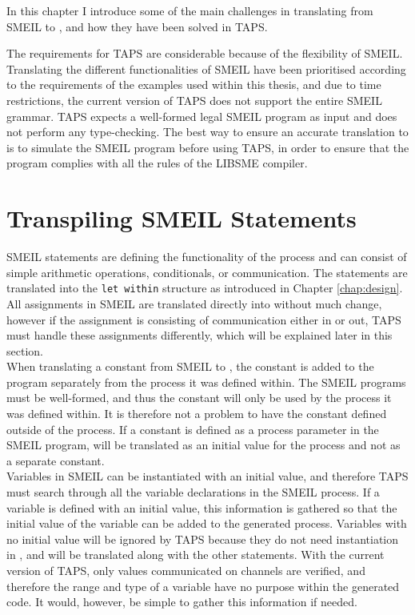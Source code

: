 In this chapter I introduce some of the main challenges in translating from SMEIL to \cspm{}, and how they have been solved in TAPS.

The requirements for TAPS are considerable because of the flexibility of SMEIL. Translating the different functionalities of SMEIL have been prioritised according to the requirements of the examples used within this thesis, and due to time restrictions, the current version of TAPS does not support the entire SMEIL grammar. TAPS expects a well-formed legal SMEIL program as input and does not perform any type-checking. The best way to ensure an accurate translation to \cspm{} is to simulate the SMEIL program before using TAPS, in order to ensure that the program complies with all the rules of the LIBSME compiler.
\section{Transpiling SMEIL Statements}
SMEIL statements are defining the functionality of the process and can consist of simple arithmetic operations, conditionals, or communication.
The statements are translated into the \texttt{let within} structure as introduced in Chapter \ref{chap:design}.\\

All assignments in SMEIL are translated directly into \cspm{} without much change, however if the assignment is consisting of communication either in or out, TAPS must handle these assignments differently, which will be explained later in this section.\\

When translating a constant from SMEIL to \cspm{}, the constant is added to the \cspm{} program separately from the process it was defined within.
The SMEIL programs must be well-formed, and thus the constant will only be used by the process it was defined within. It is therefore not a problem to have the constant defined outside of the \cspm{} process. If a constant is defined as a process parameter in the SMEIL program, will be translated as an initial value for the process and not as a separate \cspm{} constant.\\

Variables in SMEIL can be instantiated with an initial value, and therefore TAPS must search through all the variable declarations in the SMEIL process. If a variable is defined with an initial value, this information is gathered so that the initial value of the variable can be added to the generated \cspm{} process.
Variables with no initial value will be ignored by TAPS because they do not need instantiation in \cspm{}, and will be translated along with the other statements. With the current version of TAPS, only values communicated on channels are verified, and therefore the range and type of a variable have no purpose within the generated \cspm{} code. It would, however, be simple to gather this information if needed.\\

